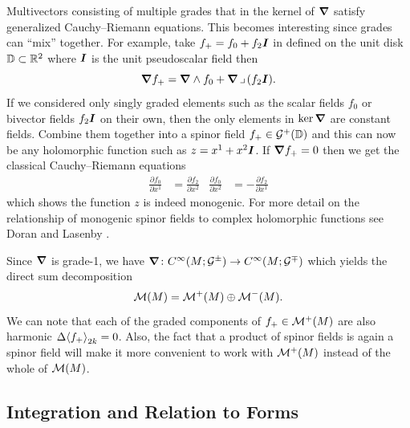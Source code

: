 \documentclass{article}
\begin{document}
Multivectors consisting of multiple grades that in the kernel of $\boldsymbol{\nabla}$ satisfy generalized Cauchy--Riemann equations. This becomes interesting since grades can ``mix'' together. For example, take $f_+ = f_0 + f_2 \boldsymbol{I}$ in defined on the unit disk $\mathbb{D} \subset \mathbb{R}^2$ where $\boldsymbol{I}$ is the unit pseudoscalar field then
\begin{equation}
\boldsymbol{\nabla} f_+ = \boldsymbol{\nabla} \wedge f_0 + \boldsymbol{\nabla} \hspace*{.5mm}\lrcorner \hspace*{.5mm} ( f_2 \boldsymbol{I}).
\end{equation}
If we considered only singly graded elements such as the scalar fields $f_0$ or bivector fields $f_2 \boldsymbol{I}$ on their own, then the only elements in $\ker \boldsymbol{\nabla}$ are constant fields. Combine them together into a spinor field $f_+ \in \mathcal{G}^+(\mathbb{D})$ and this can now be any holomorphic function such as $z=x^1+x^2\boldsymbol{I}$. If $\boldsymbol{\nabla} f_+ =0$ then we get the classical Cauchy--Riemann equations
\begin{align}
\label{eq:cauchy_riemann_equations}
\frac{\partial f_0}{\partial x^1} &= \frac{\partial f_2}{\partial x^2} & \frac{\partial f_0}{\partial x^2} &= -\frac{\partial f_2}{\partial x^1}
\end{align}
which shows the function $z$ is indeed monogenic. For more detail on the relationship of monogenic spinor fields to complex holomorphic functions see Doran and Lasenby \cite[\S 6.3.1]{doran_geometric_2003}.

Since $\boldsymbol{\nabla}$ is grade-1, we have $\boldsymbol{\nabla} \colon C^\infty(M;\mathcal{G}^{\pm}) \to C^\infty(M;\mathcal{G}^\mp)$ which yields the direct sum decomposition
\begin{equation}
    \mathcal{M}(M) = \mathcal{M}^+(M) \oplus \mathcal{M}^-(M).
\end{equation}
We can note that each of the graded components of $f_+\in \mathcal{M}^+(M)$ are also harmonic $\Delta \proj{2k}{f_+}=0$. Also, the fact that a product of spinor fields is again a spinor field will make it more convenient to work with $\mathcal{M}^+(M)$ instead of the whole of $\mathcal{M}(M)$. 




\subsection{Integration and Relation to Forms}
\end{document}
